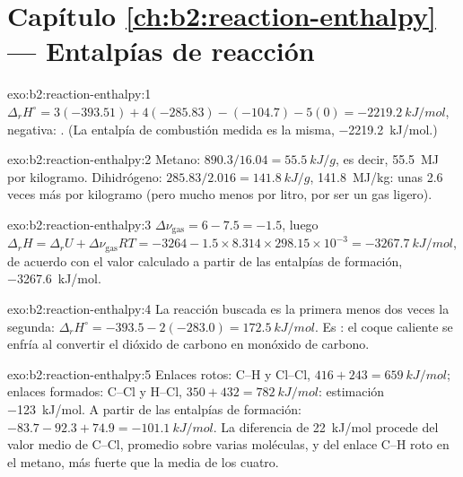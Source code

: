 \section*{Capítulo \ref{ch:b2:reaction-enthalpy} --- Entalpías de reacción}

\begin{solution}{exo:b2:reaction-enthalpy:1}
$\Delta_r H^\circ = 3(-393.51) + 4(-285.83) - (-104.7) - 5(0) =
\qty{-2219.2}{kJ/mol}$, negativa: . (La entalpía de combustión
medida es la misma, \qty{-2219.2}{kJ/mol}.)
\end{solution}

\begin{solution}{exo:b2:reaction-enthalpy:2}
Metano: $890.3/16.04 = \qty{55.5}{kJ/g}$, es decir, \qty{55.5}{MJ} por
kilogramo. Dihidrógeno: $285.83/2.016 = \qty{141.8}{kJ/g}$,
\qty{141.8}{MJ/kg}: unas 2.6 veces más por kilogramo (pero mucho menos por
litro, por ser un gas ligero).
\end{solution}

\begin{solution}{exo:b2:reaction-enthalpy:3}
$\Delta\nu_{\text{gas}} = 6 - 7.5 = -1.5$, luego $\Delta_r H = \Delta_r U +
\Delta\nu_{\text{gas}}RT = -3264 - 1.5 \times 8.314 \times 298.15 \times
10^{-3} = \qty{-3267.7}{kJ/mol}$, de acuerdo con el valor calculado a partir de
las entalpías de formación, \qty{-3267.6}{kJ/mol}.
\end{solution}

\begin{solution}{exo:b2:reaction-enthalpy:4}
La reacción buscada es la primera menos dos veces la segunda:
$\Delta_r H^\circ = -393.5 - 2(-283.0) = \qty{+172.5}{kJ/mol}$. Es
: el coque caliente se enfría al convertir el dióxido de carbono en monóxido
de carbono.
\end{solution}

\begin{solution}{exo:b2:reaction-enthalpy:5}
Enlaces rotos: C--H y Cl--Cl, $416 + 243 = \qty{659}{kJ/mol}$; enlaces
formados: C--Cl y H--Cl, $350 + 432 = \qty{782}{kJ/mol}$: estimación
\qty{-123}{kJ/mol}. A partir de las entalpías de formación: $-83.7 - 92.3 + 74.9 =
\qty{-101.1}{kJ/mol}$. La diferencia de \qty{22}{kJ/mol} procede del valor medio de C--Cl,
promedio sobre varias moléculas, y del enlace C--H roto en el
metano, más fuerte que la media de los cuatro.
\end{solution}

